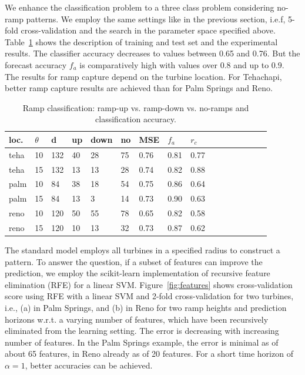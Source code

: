 \documentclass[10pt, conference, compsocconf]{IEEEtran}
\begin{document}
We enhance the classification problem to a three class problem considering no-ramp patterns. We employ the same settings like in the previous section, i.e.f, 5-fold cross-validation and the search in the parameter space specified above. Table~\ref{tab:2} shows the description of training and test set and the experimental results. The classifier accuracy decreases to values between 0.65 and 0.76. But the forecast accuracy $f_a$ is comparatively high with values over $0.8$ and up to $0.9$. The results for ramp capture depend on the turbine location. For Tehachapi, better ramp capture results are achieved than for Palm Springs and Reno.


\begin{table}[h]
\small
\caption{\label{tab:2}Ramp classification: ramp-up vs. ramp-down vs. no-ramps and classification accuracy.}
\begin{center}%
	\begin{tabular}{| l | l | l | l |l | l | l |l |l |l |l |l |l |l |l |l |}
\hline
loc.	&  $\theta$ & d & up & down & no  & MSE & $f_a$ & $r_c$  \\
\hline
teha & 10  & 132 & 40 & 28 & 75 & 0.76 &0.81 & 0.77 \\
teha & 15 & 132 &  13 & 13 & 28 & 0.74 & 0.82 & 0.88  \\ %
\hline
palm & 10  & 84 & 38 & 18 & 54 & 0.75 & 0.86 & 0.64  \\
palm & 15 & 84 & 13 & 3 & 14 & 0.73 & 0.90 & 0.63 \\
\hline
reno & 10  & 120 & 50 & 55 & 78 & 0.65 & 0.82 & 0.58  \\
reno & 15 & 120 & 10 & 13 & 32 & 0.73 & 0.87 & 0.62  \\
\hline
\end{tabular}
\end{center}
\end{table}


The standard model employs all turbines in a specified radius to construct a pattern. To answer the question, if a subset of features can improve the prediction, we employ the scikit-learn implementation of recursive feature elimination (RFE) for a linear SVM. Figure~\ref{fig:features} shows cross-validation score using RFE with a linear SVM and 2-fold cross-validation for two turbines, i.e., (a) in Palm Springs, and (b) in Reno for two ramp heights and prediction horizons w.r.t. a varying number of features, which have been recursively eliminated from the learning setting. The error is decreasing with increasing number of features. In the Palm Springs example, the error is minimal as of about 65 features, in Reno already as of 20 features. For a short time horizon of $\alpha=1$, better accuracies can be achieved.
\end{document}
